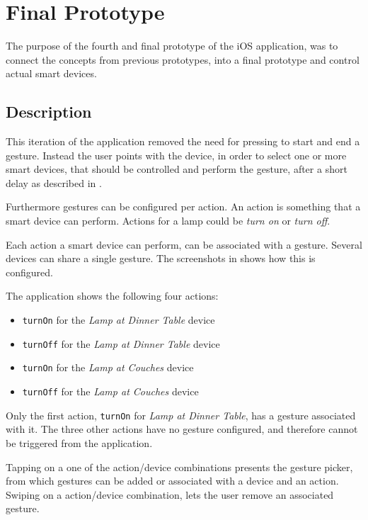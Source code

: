 \section{Final Prototype}
\label{sec:implementation:prototypes:prototype4}
The purpose of the fourth and final prototype of the iOS application, 
was to connect the concepts from previous prototypes, 
into a final prototype and control actual smart devices.

\subsection{Description}
This iteration of the application removed the need for pressing to start and end a gesture. 
Instead the user points with the device, 
in order to select one or more smart devices, 
that should be controlled and perform the gesture, 
after a short delay as described in .

Furthermore gestures can be configured per action.
An action is something that a smart device can perform. Actions for a lamp could be \textit{turn on} or \textit{turn off}.

Each action a smart device can perform, 
can be associated with a gesture. 
Several devices can share a single gesture. 
The screenshots in  shows how this is configured.

The application shows the following four actions:
\begin{itemize}
\item \texttt{turnOn} for the \emph{Lamp at Dinner Table} device
\item \texttt{turnOff} for the \emph{Lamp at Dinner Table} device
\item \texttt{turnOn} for the \emph{Lamp at Couches} device
\item \texttt{turnOff} for the \emph{Lamp at Couches} device
\end{itemize}

Only the first action, 
\texttt{turnOn} for \emph{Lamp at Dinner Table}, 
has a gesture associated with it. 
The three other actions have no gesture configured, 
and therefore cannot be triggered from the application.

Tapping on a one of the action/device combinations presents the gesture picker, 
from which gestures can be added or associated with a device and an action. 
Swiping on a action/device combination, 
lets the user remove an associated gesture.

